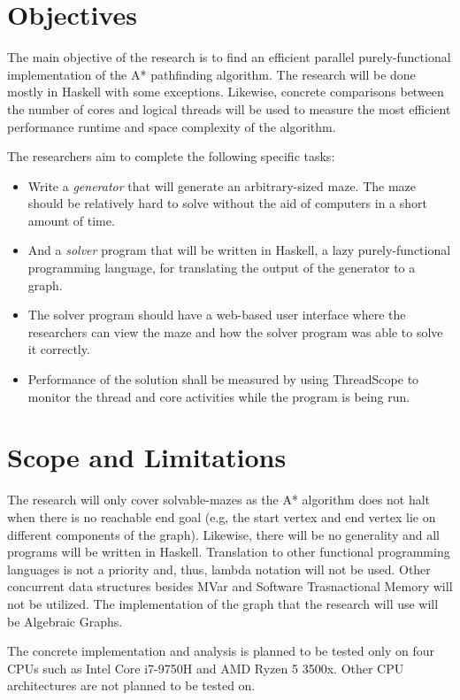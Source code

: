 \section{Objectives}
The main objective of the research is to find an efficient parallel purely-functional implementation 
of the A* pathfinding algorithm. The research will be done mostly in Haskell with some exceptions.
Likewise, concrete comparisons between the number of cores and logical threads will be used to measure 
the most efficient performance runtime and space complexity of the algorithm.

The researchers aim to complete the following specific tasks:
\begin{itemize}
    \item Write a \emph{generator} that will generate an arbitrary-sized maze. The maze should be relatively 
        hard to solve without the aid of computers in a short amount of time.\cite{Buck2015}
    \item And a \emph{solver} program that will be written in Haskell, a lazy purely-functional programming language,
        for translating the output of the generator to a graph.\cite{HaskellSite}
    \item The solver program should have a web-based user interface where the researchers can view the maze and how 
        the solver program was able to solve it correctly.
    \item Performance of the solution shall be measured by using ThreadScope to monitor the thread and core activities 
        while the program is being run.\cite{ThreadScope}
\end{itemize}
\section{Scope and Limitations}

The research will only cover solvable-mazes as the A* algorithm does not halt when there is no reachable end goal (e.g,
the start vertex and end vertex lie on different components of the graph).\cite{HartNilssonRaphael1968} Likewise, there will be no generality
and all programs will be written in Haskell. Translation to other functional programming languages is not a priority and, thus,
lambda notation will not be used. Other concurrent data structures besides MVar and Software Trasnactional Memory will not be utilized. The 
implementation of the graph that the research will use will be Algebraic Graphs.\cite{Mokhov2017}

The concrete implementation and analysis is planned to be tested only on four CPUs such as Intel Core i7-9750H and AMD Ryzen 5 3500x.
Other CPU architectures are not planned to be tested on.